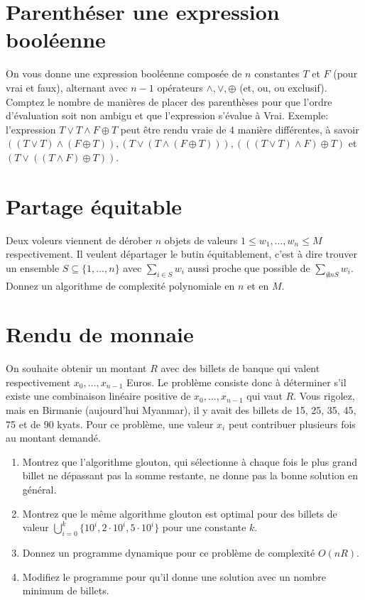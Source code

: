 \documentclass[12pt]{article}
\begin{document}
\section{Parenthéser une expression booléenne}

On vous donne une expression booléenne composée de $n$ constantes $T$ et $F$ (pour vrai et faux), alternant avec $n-1$ opérateurs $\wedge,\vee,\oplus$ (et, ou, ou exclusif).  Comptez le nombre de manières de placer des parenthèses pour que l'ordre d'évaluation soit non ambigu et que l'expression s'évalue à Vrai.  Exemple: l'expression  $T \vee T \wedge F \oplus T$ peut être rendu vraie de 4 manière différentes, à savoir
$((T\vee T)\wedge (F\oplus  T)), (T\vee (T\wedge (F\oplus  T))), (((T\vee T)\wedge F)\oplus  T)$
et $(T\vee ((T\wedge F)\oplus  T))$.

\section{Partage équitable}

Deux voleurs viennent de dérober $n$ objets de valeurs $1\leq w_1,\ldots,w_n \leq M$ respectivement.  Il veulent départager le butin équitablement, c'est à dire trouver un ensemble $S\subseteq \{1,\ldots,n\}$ avec $\sum_{i\in S} w_i$ aussi proche que possible de $\sum_{i\not in S} w_i$.
Donnez un algorithme de complexité polynomiale en $n$ et en $M$.

\section{Rendu de monnaie}


On souhaite obtenir un
montant $R$ avec des billets de banque qui valent respectivement
$x_0,\ldots,x_{n-1}$ Euros. Le problème consiste donc à déterminer s'il existe une combinaison linéaire
positive de $x_0,\ldots,x_{n-1}$ qui vaut $R$. Vous rigolez, mais en Birmanie (aujourd'hui Myanmar), il y
avait des billets de 15, 25, 35, 45, 75 et de 90 kyats.
Pour ce problème, une valeur $x_i$ peut
contribuer plusieurs fois au montant demandé.

\begin{enumerate}
    \item Montrez que l'algorithme glouton, qui sélectionne à chaque fois le plus grand billet ne dépassant pas la somme restante, ne donne pas la bonne solution en général.
\item
Montrez que le même algorithme glouton est optimal pour des billets de valeur $\bigcup_{i=0}^k \{10^i, 2\cdot 10^i, 5\cdot 10^i\}$ pour une constante $k$.
\item
Donnez un programme dynamique pour ce problème de complexité $O(nR)$.
\item
Modifiez le programme pour qu'il donne une solution avec un nombre minimum de billets.
\end{enumerate}
\end{document}
